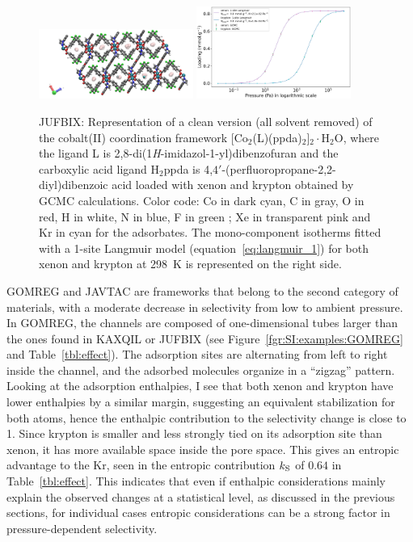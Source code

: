 \documentclass[main.tex]{subfiles}
\begin{document}
\begin{figure}[ht]
  \centering
    \includegraphics[width=0.45\textwidth]{figures/2-thermo/JUFBIX_clean.jpg}
    \includegraphics[width=0.45\textwidth]{figures/2-thermo/JUFBIX_clean_isotherm_xenon_krypton_298K.jpg}
    \caption{JUFBIX: Representation of a clean version (all solvent removed) of the cobalt(II) coordination framework [Co$_2$(L)(ppda)$_2$]$_2\cdot$H$_2$O, where the ligand L is 2,8-di(1\emph{H}-imidazol-1-yl)dibenzofuran and the carboxylic acid ligand H$_2$ppda is 4,$4'$-(perfluoropropane-2,2-diyl)dibenzoic acid loaded with xenon and krypton obtained by GCMC calculations. Color code: Co in dark cyan, C in gray, O in red, H in white, N in blue, F in green ; Xe in transparent pink and Kr in cyan for the adsorbates. The mono-component isotherms fitted with a 1-site Langmuir model (equation~\ref{eq:langmuir_1}) for both xenon and krypton at \SI{298}{\kelvin} is represented on the right side.}\label{fgr:SI:examples:JUFBIX}
  \end{figure}

GOMREG and JAVTAC are frameworks that belong to the second category of materials, with a moderate decrease in selectivity from low to ambient pressure. In GOMREG, the channels are composed of one-dimensional tubes larger than the ones found in KAXQIL or JUFBIX (see Figure~\ref{fgr:SI:examples:GOMREG} and Table~\ref{tbl:effect}). The adsorption sites are alternating from left to right inside the channel, and the adsorbed molecules organize in a ``zigzag'' pattern. Looking at the adsorption enthalpies, I see that both xenon and krypton have lower enthalpies by a similar margin, suggesting an equivalent stabilization for both atoms, hence the enthalpic contribution to the selectivity change is close to 1.
Since krypton is smaller and less strongly tied on its adsorption site than xenon, it has more available space inside the pore space. This gives an entropic advantage to the Kr, seen in the entropic contribution $k_{\text{S}}$ of $0.64$ in Table~\ref{tbl:effect}. This indicates that even if enthalpic considerations mainly explain the observed changes at a statistical level, as discussed in the previous sections, for individual cases entropic considerations can be a strong factor in pressure-dependent selectivity.
\end{document}
